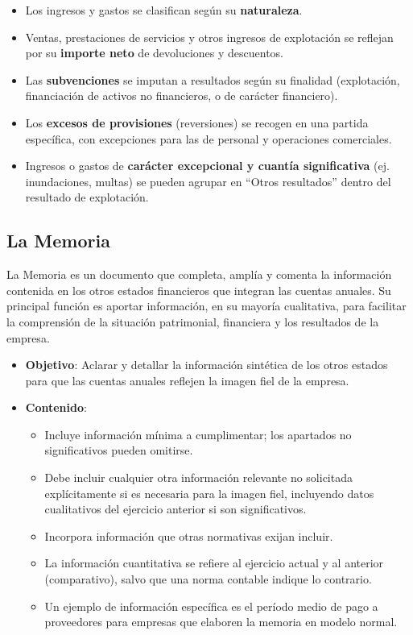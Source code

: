 \documentclass[
  paper=a4,
  ,captions=tableheading
]{scrbook}
\providecommand{\tightlist}{%
  \setlength{\itemsep}{0pt}\setlength{\parskip}{0pt}}
\begin{document}
\begin{itemize}
  \begin{itemize}
  \tightlist
  \item
    Los ingresos y gastos se clasifican según su \textbf{naturaleza}.
  \item
    Ventas, prestaciones de servicios y otros ingresos de explotación se
    reflejan por su \textbf{importe neto} de devoluciones y descuentos.
  \item
    Las \textbf{subvenciones} se imputan a resultados según su finalidad
    (explotación, financiación de activos no financieros, o de carácter
    financiero).
  \item
    Los \textbf{excesos de provisiones} (reversiones) se recogen en una
    partida específica, con excepciones para las de personal y
    operaciones comerciales.
  \item
    Ingresos o gastos de \textbf{carácter excepcional y cuantía
    significativa} (ej. inundaciones, multas) se pueden agrupar en
    ``Otros resultados'' dentro del resultado de explotación.
  \end{itemize}
\end{itemize}

\hypertarget{la-memoria}{%
\subsection{La Memoria}\label{la-memoria}}

La Memoria es un documento que completa, amplía y comenta la información
contenida en los otros estados financieros que integran las cuentas
anuales. Su principal función es aportar información, en su mayoría
cualitativa, para facilitar la comprensión de la situación patrimonial,
financiera y los resultados de la empresa.

\begin{itemize}
\tightlist
\item
  \textbf{Objetivo}: Aclarar y detallar la información sintética de los
  otros estados para que las cuentas anuales reflejen la imagen fiel de
  la empresa.
\item
  \textbf{Contenido}:

  \begin{itemize}
  \tightlist
  \item
    Incluye información mínima a cumplimentar; los apartados no
    significativos pueden omitirse.
  \item
    Debe incluir cualquier otra información relevante no solicitada
    explícitamente si es necesaria para la imagen fiel, incluyendo datos
    cualitativos del ejercicio anterior si son significativos.
  \item
    Incorpora información que otras normativas exijan incluir.
  \item
    La información cuantitativa se refiere al ejercicio actual y al
    anterior (comparativo), salvo que una norma contable indique lo
    contrario.
  \item
    Un ejemplo de información específica es el período medio de pago a
    proveedores para empresas que elaboren la memoria en modelo normal.
  \end{itemize}
\end{itemize}
\end{document}
